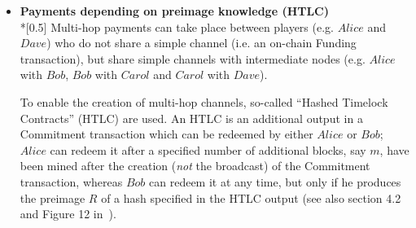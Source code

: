 \begin{itemize}
  \item \textbf{Payments depending on preimage knowledge (HTLC)} \ \\*[0.5\baselineskip]
    Multi-hop payments can take place between players (e.g. $Alice$ and $Dave$) who do not
    share a simple channel (i.e. an on-chain Funding transaction), but share simple
    channels with intermediate nodes (e.g. $Alice$ with $Bob$, $Bob$ with $Carol$ and
    $Carol$ with $Dave$).

    To enable the creation of multi-hop channels, so-called ``Hashed Timelock Contracts''
    (HTLC) are used. An HTLC is an additional output in a Commitment transaction which can
    be redeemed by either $Alice$ or $Bob$; $Alice$ can redeem it after a specified number
    of additional blocks, say $m$, have been mined after the creation (\textit{not} the
    broadcast) of the Commitment transaction, whereas $Bob$ can redeem it at any time, but
    only if he produces the preimage $R$ of a hash specified in the HTLC output (see also
    section 4.2 and Figure 12 in~\cite{lightning}).


\end{itemize}
